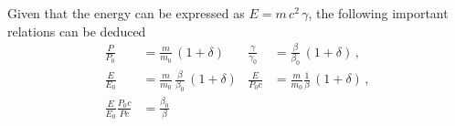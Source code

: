Given that the energy can be expressed as $E=m\,c^2\,\gamma$, the following important relations can be deduced
\begin{align}
\frac{P}{P_0} &= \frac{m}{m_0} \, (1+\delta) & \frac{\gamma}{\gamma_0} &= \frac{\beta}{\beta_0} \, (1+\delta) \, , \label{eq:p_over_p0}\\ 
\frac{E}{E_0} &= \frac{m}{m_0} \, \frac{\beta}{\beta_0} \, (1+\delta) & \frac{E}{P_0 c} &= \frac{m}{m_0} \frac{1}{\beta} \, (1+\delta) \, , \\
\frac{E}{E_0} \frac{P_0 c}{P c} &= \frac{\beta_0}{\beta}
\end{align}





